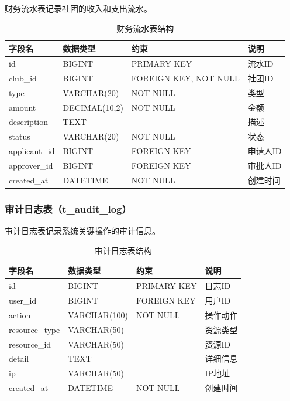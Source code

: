 财务流水表记录社团的收入和支出流水。

\begin{table}[H]
\centering
\caption{财务流水表结构}
\begin{tabular}{llll}
\toprule
字段名 & 数据类型 & 约束 & 说明 \\
\midrule
id & BIGINT & PRIMARY KEY & 流水ID \\
club\_id & BIGINT & FOREIGN KEY, NOT NULL & 社团ID \\
type & VARCHAR(20) & NOT NULL & 类型 \\
amount & DECIMAL(10,2) & NOT NULL & 金额 \\
description & TEXT & & 描述 \\
status & VARCHAR(20) & NOT NULL & 状态 \\
applicant\_id & BIGINT & FOREIGN KEY & 申请人ID \\
approver\_id & BIGINT & FOREIGN KEY & 审批人ID \\
created\_at & DATETIME & NOT NULL & 创建时间 \\
\bottomrule
\end{tabular}
\end{table}

\subsubsection{审计日志表（t\_audit\_log）}

审计日志表记录系统关键操作的审计信息。

\begin{table}[H]
\centering
\caption{审计日志表结构}
\begin{tabular}{llll}
\toprule
字段名 & 数据类型 & 约束 & 说明 \\
\midrule
id & BIGINT & PRIMARY KEY & 日志ID \\
user\_id & BIGINT & FOREIGN KEY & 用户ID \\
action & VARCHAR(100) & NOT NULL & 操作动作 \\
resource\_type & VARCHAR(50) & & 资源类型 \\
resource\_id & VARCHAR(50) & & 资源ID \\
detail & TEXT & & 详细信息 \\
ip & VARCHAR(50) & & IP地址 \\
created\_at & DATETIME & NOT NULL & 创建时间 \\
\bottomrule
\end{tabular}
\end{table}

